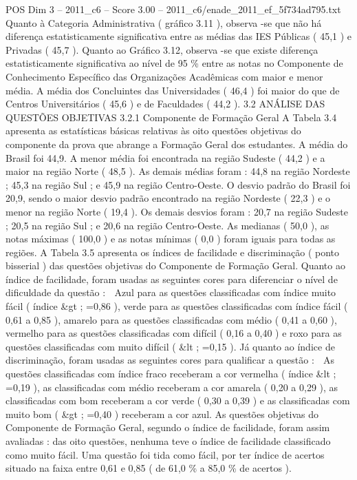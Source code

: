\begin{textsample}{POS Dim 3 – 2011\_c6 – Score 3.00 – 2011\_c6/enade\_2011\_ef\_5f734ad795.txt}
Quanto à Categoria Administrativa ( gráfico 3.11 ), observa -se que não há diferença estatisticamente significativa entre as médias das IES Públicas ( 45,1 ) e Privadas ( 45,7 ).
Quanto ao Gráfico 3.12, observa -se que existe diferença estatisticamente significativa ao nível de 95 \% entre as notas no Componente de Conhecimento Específico das Organizações Acadêmicas com maior e menor média.
A média dos Concluintes das Universidades ( 46,4 ) foi maior do que de Centros Universitários ( 45,6 ) e de Faculdades ( 44,2 ). 3.2 ANÁLISE DAS QUESTÕES OBJETIVAS 3.2.1 Componente de Formação Geral A Tabela 3.4 apresenta as estatísticas básicas relativas às oito questões objetivas do componente da prova que abrange a Formação Geral dos estudantes.
A média do Brasil foi 44,9.
A menor média foi encontrada na região Sudeste ( 44,2 ) e a maior na região Norte ( 48,5 ).
As demais médias foram : 44,8 na região Nordeste ; 45,3 na região Sul ; e 45,9 na região Centro-Oeste.
O desvio padrão do Brasil foi 20,9, sendo o maior desvio padrão encontrado na região Nordeste ( 22,3 ) e o menor na região Norte ( 19,4 ).
Os demais desvios foram : 20,7 na região Sudeste ; 20,5 na região Sul ; e 20,6 na região Centro-Oeste.
As medianas ( 50,0 ), as notas máximas ( 100,0 ) e as notas mínimas ( 0,0 ) foram iguais para todas as regiões.
A Tabela 3.5 apresenta os índices de facilidade e discriminação ( ponto bisserial ) das questões objetivas do Componente de Formação Geral.
Quanto ao índice de facilidade, foram usadas as seguintes cores para diferenciar o nível de dificuldade da questão :  Azul para as questões classificadas com índice muito fácil ( índice \&gt ; =0,86 ), verde para as questões classificadas com índice fácil ( 0,61 a 0,85 ), amarelo para as questões classificadas com médio ( 0,41 a 0,60 ), vermelho para as questões classificadas com difícil ( 0,16 a 0,40 ) e roxo para as questões classificadas com muito difícil ( \&lt ; =0,15 ).
Já quanto ao índice de discriminação, foram usadas as seguintes cores para qualificar a questão :  As questões classificadas com índice fraco receberam a cor vermelha ( índice \&lt ; =0,19 ), as classificadas com médio receberam a cor amarela ( 0,20 a 0,29 ), as classificadas com bom receberam a cor verde ( 0,30 a 0,39 ) e as classificadas com muito bom ( \&gt ; =0,40 ) receberam a cor azul.
As questões objetivas do Componente de Formação Geral, segundo o índice de facilidade, foram assim avaliadas : das oito questões, nenhuma teve o índice de facilidade classificado como muito fácil.
Uma questão foi tida como fácil, por ter índice de acertos situado na faixa entre 0,61 e 0,85 ( de 61,0 \% a 85,0 \% de acertos ).

\end{textsample}
